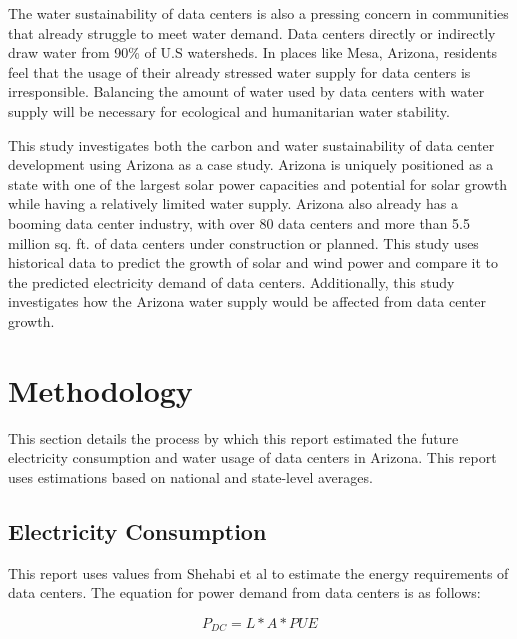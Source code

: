 \documentclass[letterpaper, 12 pt]{article}  %
\begin{document}
The water sustainability of data centers is also a pressing concern in communities that already struggle to meet water demand. Data centers directly or indirectly draw water from 90\% of U.S watersheds\cite{EnvImpactDC}. In places like Mesa, Arizona, residents feel that the usage of their already stressed water supply for data centers is irresponsible\cite{CloudImpact}. Balancing the amount of water used by data centers with water supply will be necessary for ecological and humanitarian water stability.

This study investigates both the carbon and water sustainability of data center development using Arizona as a case study. Arizona is uniquely positioned as a state with one of the largest solar power capacities and potential for solar growth \cite{AZEnergy} while having a relatively limited water supply. Arizona also already has a booming data center industry, with over 80 data centers \cite{DCStats} and more than 5.5 million sq. ft. of data centers under construction or planned. This study uses historical data to predict the growth of solar and wind power and compare it to the predicted electricity demand of data centers. Additionally, this study investigates how the Arizona water supply would be affected from data center growth.  

\section{Methodology}

This section details the process by which this report estimated the future electricity consumption and water usage of data centers in Arizona. This report uses estimations based on national and state-level averages.



\subsection{Electricity Consumption}

This report uses values from Shehabi et al\cite{LoadIntensity} to estimate the energy requirements of data centers. The equation for power demand from data centers is as follows:

\begin{equation}
    P_{DC} = L * A * PUE
\end{equation}
\end{document}
